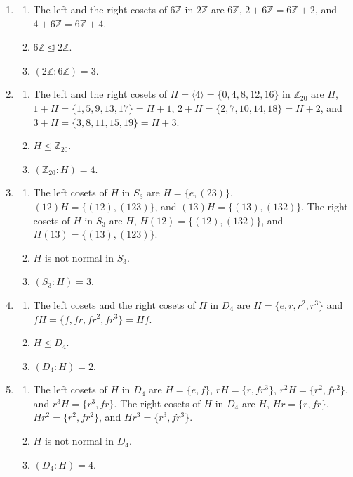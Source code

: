 \documentclass[10pt,]{book}
\theoremstyle{plain}
\theoremstyle{definition}
\theoremstyle{definition}
\theoremstyle{definition}
\theoremstyle{definition}
\numberwithin{equation}{section}
\def\Z{\mathbb{Z}}
\begin{document}
\begin{enumerate}[label=(\alph*)]
\item\hypertarget{li-417}{}%
\begin{enumerate}[label=\roman*.]
\item\hypertarget{li-418}{}The left and the right cosets of \(6\Z\) in \(2\Z\) are \(6\Z\), \(2+6\Z=6\Z+2\), and \(4+6\Z=6\Z+4\).%
\item\hypertarget{li-419}{}\(6\Z \unlhd 2\Z\).%
\item\hypertarget{li-420}{}\((2\Z:6\Z)=3\).%
\end{enumerate}
%
\item\hypertarget{li-421}{}%
\begin{enumerate}[label=\roman*.]
\item\hypertarget{li-422}{}The left and the right cosets of \(H=\langle 4\rangle =\{0,4,8,12,16\}\) in \(\Z_{20}\) are \(H\), \(1+H=\{1,5,9,13,17\}=H+1\), \(2+H=\{2,7,10,14,18\}=H+2\), and \(3+H=\{3,8,11,15,19\}=H+3\).%
\item\hypertarget{li-423}{}\(H \unlhd \Z_{20}\).%
\item\hypertarget{li-424}{}\((\Z_{20}:H)=4\).%
\end{enumerate}
%
\item\hypertarget{li-425}{}%
\begin{enumerate}[label=\roman*.]
\item\hypertarget{li-426}{}The left cosets of \(H\) in \(S_3\) are \(H=\{e,(23)\}\), \((12)H=\{(12),(123)\}\), and \((13)H=\{(13),(132)\}\). The right cosets of \(H\) in \(S_3\) are \(H\), \(H(12)=\{(12),(132)\}\), and \(H(13)=\{(13),(123)\}\).%
\item\hypertarget{li-427}{}\(H\) is not normal in \(S_3\).%
\item\hypertarget{li-428}{}\((S_3:H)=3\).%
\end{enumerate}
%
\item\hypertarget{li-429}{}%
\begin{enumerate}[label=\roman*.]
\item\hypertarget{li-430}{}The left cosets and the right cosets of \(H\) in \(D_4\) are \(H=\{e,r,r^2,r^3\}\) and \(fH=\{f,fr, fr^2, fr^3\}=Hf\).%
\item\hypertarget{li-431}{}\(H\unlhd D_4\).%
\item\hypertarget{li-432}{}\((D_4:H)=2\).%
\end{enumerate}
%
\item\hypertarget{li-433}{}%
\begin{enumerate}[label=\roman*.]
\item\hypertarget{li-434}{}The left cosets of \(H\) in \(D_4\) are \(H=\{e,f\}\), \(rH=\{r,fr^3\}\), \(r^2H=\{r^2,fr^2\}\), and \(r^3H=\{r^3, fr\}\). The right cosets of \(H\) in \(D_4\) are \(H\), \(Hr=\{r, fr\}\), \(Hr^2=\{r^2,fr^2\}\), and \(Hr^3=\{r^3, fr^3\}\).%
\item\hypertarget{li-435}{}\(H\) is not normal in \(D_4\).%
\item\hypertarget{li-436}{}\((D_4:H)=4\).%
\end{enumerate}
%
\end{enumerate}
\end{document}
